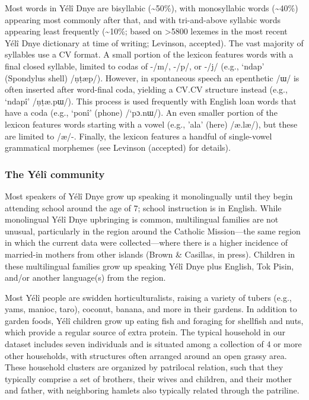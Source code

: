 \documentclass[english,,man,floatsintext]{apa6}
\begin{document}
Most words in Yélî Dnye are bisyllabic (\textasciitilde{}50\%), with
monosyllabic words (\textasciitilde{}40\%) appearing most commonly after
that, and with tri-and-above syllabic words appearing least frequently
(\textasciitilde{}10\%; based on \textgreater{}5800 lexemes in the most
recent Yélî Dnye dictionary at time of writing; Levinson, accepted). The
vast majority of syllables use a CV format. A small portion of the
lexicon features words with a final closed syllable, limited to codas of
-/m/, -/p/, or -/j/ (e.g., `ndap' (Spondylus shell) /ṇṭæp/). However, in
spontaneous speech an epenthetic /ɯ/ is often inserted after word-final
coda, yielding a CV.CV structure instead (e.g., `ndapî' /ṇṭæ.pɯ/). This
process is used frequently with English loan words that have a coda
(e.g., `ponî' (phone) /`pɔ.nɯ/). An even smaller portion of the lexicon
features words starting with a vowel (e.g., 'ala' (here) /æ.læ/), but
these are limited to /æ/-. Finally, the lexicon features a handful of
single-vowel grammatical morphemes (see Levinson (accepted) for
details).

\subsubsection{The Yélî community}\label{the-yuxe9luxee-community}

Most speakers of Yélî Dnye grow up speaking it monolingually until they
begin attending school around the age of 7; school instruction is in
English. While monolingual Yélî Dnye upbringing is common, multilingual
families are not unusual, particularly in the region around the Catholic
Mission---the same region in which the current data were
collected---where there is a higher incidence of married-in mothers from
other islands (Brown \& Casillas, in press). Children in these
multilingual families grow up speaking Yélî Dnye plus English, Tok
Pisin, and/or another language(s) from the region.

Most Yélî people are swidden horticulturalists, raising a variety of
tubers (e.g., yams, manioc, taro), coconut, banana, and more in their
gardens. In addition to garden foods, Yélî children grow up eating fish
and foraging for shellfish and nuts, which provide a regular source of
extra protein. The typical household in our dataset includes seven
individuals and is situated among a collection of 4 or more other
households, with structures often arranged around an open grassy area.
These household clusters are organized by patrilocal relation, such that
they typically comprise a set of brothers, their wives and children, and
their mother and father, with neighboring hamlets also typically related
through the patriline.
\end{document}
